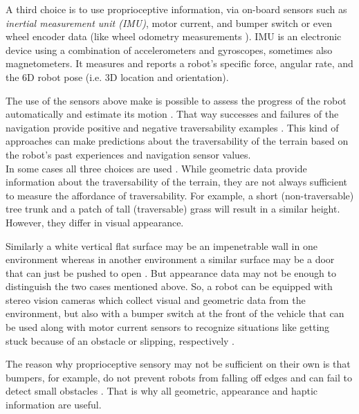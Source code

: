\documentclass[12pt,a4paper]{report}
\newcommand{\term}{\textit}
\newcommand{\acronym}{\MakeUppercase}
\begin{document}
	A third choice is to use proprioceptive information, via on-board sensors such 
	as \term{inertial measurement unit (\acronym{imu})}, motor current, and bumper 
	switch \citep{Kim} or even wheel encoder data \citep{Lee} (like wheel odometry 
	measurements \citep{Droeschel}). \acronym{imu} is an electronic device using 
	a combination of accelerometers and gyroscopes, sometimes also magnetometers. 
	It measures and reports a robot's specific force, angular rate, and the 
	\acronym{6d} robot pose (i.e. \acronym{3d} location and orientation).
	\par
	The use of the sensors above make is possible to assess the progress of the 
	robot automatically and estimate its motion \citep{Droeschel}. That way successes 
	and failures of the navigation provide positive and negative traversability 
	examples \citep{Kim}. This kind of approaches can make predictions about the 
	traversability of the terrain based on the robot's past experiences and 
	navigation sensor values.
	\\
	
	In some cases all three choices are used \citep{Kim, Shneier}. While geometric 
	data provide information about the traversability of the terrain, they are 
	not always sufficient to measure the affordance of traversability. For 
	example, a short (non-traversable) tree trunk and a patch of tall (traversable) 
	grass will result in a similar height. However, they differ in visual 
	appearance. 
	\par 
	Similarly a white vertical flat surface may be an impenetrable wall in one 
	environment whereas in another environment a similar surface may be a door that 
	can just be pushed to open \citep{Ugur}. But appearance data may not be enough 
	to distinguish the two cases mentioned above. So, a robot can be equipped with 
	stereo vision cameras which collect visual and geometric data from the 
	environment, but also with a bumper switch at the front of the vehicle that can 
	be used along with motor current sensors to recognize situations like getting 
	stuck because of an obstacle or slipping, respectively \citep{Kim}.
	\par
	The reason why proprioceptive sensory may not be sufficient on their own is that 
	bumpers, for example, do not prevent robots from falling off edges and can fail 
	to detect small obstacles \citep{HiroseGonet}. That is why all geometric, 
	appearance and haptic information are useful.
	\\\\
	
\end{document}
